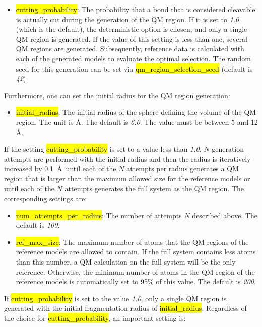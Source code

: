 \documentclass[]{tufte-book}
\begin{document}
{{\begin{itemize}
\item \hl{cutting\_probability}: The probability that a bond that is considered cleavable is actually cut during the generation of the QM region. If it is set to \textit{1.0} (which is the default), the deterministic option is chosen, and only a single QM region is generated.
If the value of this setting is less than one, several QM regions are generated. Subsequently, reference data is calculated with each of the generated models to evaluate the optimal selection. The random seed for this generation can be set via \hl{qm\_region\_selection\_seed} (default is \textit{42}).
\end{itemize}

Furthermore, one can set the initial radius for the QM region generation:

\begin{itemize}
\item \hl{initial\_radius}:  The initial radius of the sphere defining the volume of the QM region. The unit is \AA. The default is \textit{6.0}. The value must be between 5 and 12 \AA.
\end{itemize}

If the setting \hl{cutting\_probability} is set to a value less than \textit{1.0}, $N$ generation attempts are performed with the initial radius and then the radius is iteratively increased by 0.1~\AA~until each of the $N$ attempts per radius generates a QM region that is larger than the maximum allowed size for the reference models or until each of the $N$ attempts generates the full system as the QM region. The corresponding settings are:
\begin{itemize}
\item \hl{num\_attempts\_per\_radius}: The number of attempts $N$ described above. The default is \textit{100}.
\item \hl{ref\_max\_size}: The maximum number of atoms that the QM regions of the reference models are allowed to contain. If the full system contains less atoms than this number, a QM calculation on the full system will be the only reference. Otherwise, the minimum number of atoms in the QM region of the reference models is automatically set to 95\% of this value. The default is \textit{200}.
\end{itemize}

If \hl{cutting\_probability} is set to the value \textit{1.0}, only a single QM region is generated with the initial fragmentation radius of \hl{initial\_radius}. Regardless of the choice for \hl{cutting\_probability}, an important setting is:

}}
\end{document}
